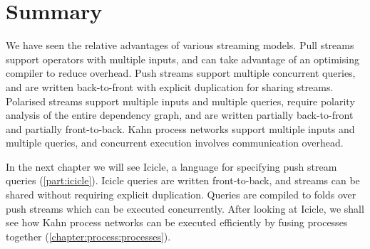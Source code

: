 


\section{Summary}
We have seen the relative advantages of various streaming models.
Pull streams support operators with multiple inputs, and can take advantage of an optimising compiler to reduce overhead.
Push streams support multiple concurrent queries, and are written back-to-front with explicit duplication for sharing streams.
Polarised streams support multiple inputs and multiple queries, require polarity analysis of the entire dependency graph, and are written partially back-to-front and partially front-to-back.
Kahn process networks support multiple inputs and multiple queries, and concurrent execution involves communication overhead.

In the next chapter we will see Icicle, a language for specifying push stream queries (\cref{part:icicle}).
Icicle queries are written front-to-back, and streams can be shared without requiring explicit duplication.
Queries are compiled to folds over push streams which can be executed concurrently.
After looking at Icicle, we shall see how Kahn process networks can be executed efficiently by fusing processes together (\cref{chapter:process:processes}).

